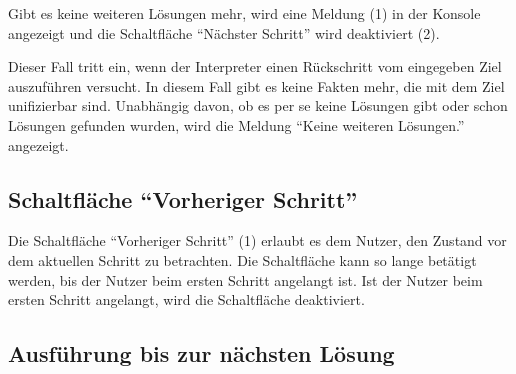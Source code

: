 \documentclass[parskip=full,11pt,twoside]{scrartcl}
\begin{document}
\begin{minipage}{\linewidth}
\end{minipage}

Gibt es keine weiteren Lösungen mehr, wird eine Meldung (1) in der Konsole angezeigt und die Schaltfläche \enquote{Nächster Schritt} wird deaktiviert (2).

Dieser Fall tritt ein, wenn der Interpreter einen Rückschritt vom eingegeben Ziel auszuführen versucht.
In diesem Fall gibt es keine Fakten mehr, die mit dem Ziel unifizierbar sind.
Unabhängig davon, ob es per se keine Lösungen gibt oder schon Lösungen gefunden wurden, wird die Meldung \enquote{Keine weiteren Lösungen.} angezeigt.

\subsection{Schaltfläche \enquote{Vorheriger Schritt}}

\begin{minipage}{\linewidth}
\end{minipage}

\begin{minipage}{\linewidth}
\end{minipage}

Die Schaltfläche \enquote{Vorheriger Schritt} (1) erlaubt es dem Nutzer, den Zustand vor dem aktuellen Schritt zu betrachten.
Die Schaltfläche kann so lange betätigt werden, bis der Nutzer beim ersten Schritt angelangt ist.
Ist der Nutzer beim ersten Schritt angelangt, wird die Schaltfläche deaktiviert.

\subsection{Ausführung bis zur nächsten Lösung}

\begin{minipage}{\linewidth}
\end{minipage}
\end{document}
